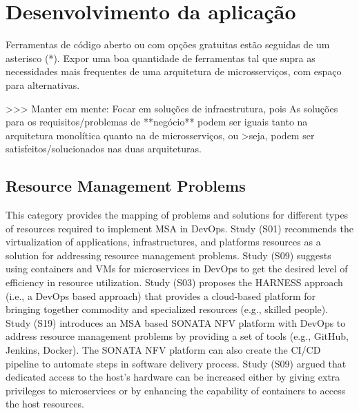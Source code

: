 \chapter{Desenvolvimento da aplicação}\label{chapter-ferramentas}



Ferramentas de código aberto ou com opções gratuitas estão seguidas de um asterisco (*).
Expor uma boa quantidade de ferramentas tal que supra as necessidades mais frequentes de uma arquitetura de microsserviços, com espaço para alternativas.

>>> Manter em mente: Focar em soluções de infraestrutura, pois As soluções para os requisitos/problemas de **negócio** podem ser iguais tanto na arquitetura monolítica quanto na de microsserviços, ou >seja, podem ser satisfeitos/solucionados nas duas arquiteturas.

\section{Resource Management Problems}
This category provides the mapping of problems and solutions for different types of resources required to implement MSA in DevOps. Study (S01) recommends the virtualization of applications, infrastructures, and platforms resources as a solution for addressing resource management problems. Study (S09) suggests using containers and VMs for microservices in DevOps to get the desired level of efficiency in resource utilization. Study (S03) proposes the HARNESS approach (i.e., a DevOps based approach) that provides a cloud-based platform for bringing together commodity and specialized resources (e.g., skilled people). Study (S19) introduces an MSA based SONATA NFV platform with DevOps to address resource management problems by providing a set of tools (e.g., GitHub, Jenkins, Docker). The SONATA NFV platform can also create the CI/CD pipeline to automate steps in software delivery process. Study (S09) argued that dedicated access to the host’s hardware can be increased either by giving extra privileges to microservices or by enhancing the capability of containers to access the host resources.

